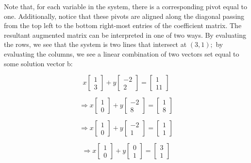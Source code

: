 \documentclass{article}
\begin{document}
Note that, for each variable in the system, there is a corresponding
pivot equal to one. Additionally, notice that these pivots are aligned
along the diagonal passing from the top left to the bottom right-most
entries of the coefficient matrix. The resultant augmented matrix can be
interpreted in one of two ways. By evaluating the rows, we see that the
system is two lines that intersect at \((3,1);\) by evaluating the
columns, we see a linear combination of two vectors set equal to some
solution vector b:

\[ x\begin{bmatrix} 1 \\ 3 \end{bmatrix} + y\begin{bmatrix} -2 \\ 2 \end{bmatrix} = \begin{bmatrix} 1 \\ 11 \end{bmatrix} \]

\[ \Rightarrow x\begin{bmatrix} 1 \\ 0 \end{bmatrix} + y\begin{bmatrix} -2 \\ 8 \end{bmatrix} = \begin{bmatrix} 1 \\ 8 \end{bmatrix} \]

\[ \Rightarrow x\begin{bmatrix} 1 \\ 0 \end{bmatrix} + y\begin{bmatrix} -2 \\ 1 \end{bmatrix} = \begin{bmatrix} 1 \\ 1 \end{bmatrix}\]

\[\Rightarrow x\begin{bmatrix} 1 \\ 0 \end{bmatrix} + y\begin{bmatrix} 0 \\ 1 \end{bmatrix} = \begin{bmatrix} 3 \\ 1 \end{bmatrix}\]
\end{document}
